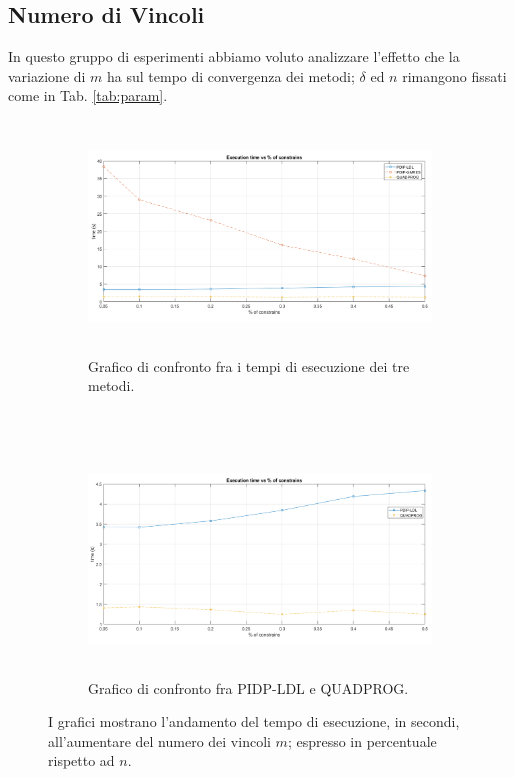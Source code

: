 \subsection{Numero di Vincoli}

 In questo gruppo di esperimenti abbiamo voluto analizzare l'effetto che la variazione di $m$ ha sul tempo di convergenza dei metodi; $\delta$ ed $n$ rimangono fissati come in Tab. \ref{tab:param}.

\begin{figure}[h!]
    \centering
    \begin{subfigure}[h]{0.5\textwidth}
        \centering
        \includegraphics[width=\textwidth, height=2.42in]{img/MU2.png}
    \caption{Grafico di confronto fra i tempi di esecuzione dei tre metodi. \label{fig:exp2}}
    \end{subfigure}%
    ~ 
    \begin{subfigure}[h]{0.5\textwidth}
        \centering
         \includegraphics[width=\textwidth, height=2.4in]{img/MU3.png}
    \caption{Grafico di confronto fra PIDP-LDL e QUADPROG. \label{fig:exp2.1}}
    \end{subfigure}
    \caption{I grafici mostrano l'andamento del tempo di esecuzione, in secondi, all'aumentare del numero dei vincoli $m$; espresso in percentuale rispetto ad $n$. \label{fig:exp22}}
\end{figure}
 
